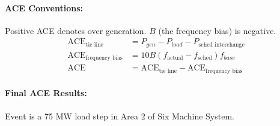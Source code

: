 \documentclass[12pt]{article}
\begin{document}
\begin{multicols}{2}
		

\vfill\null

\end{multicols}

\pagebreak
\paragraph{ACE Conventions:} Positive ACE denotes over generation. $B$ (the frequency bias) is negative.
\begin{align*}
\text{ACE}_{\text{tie line}} &= P_{gen} - P_{load} - P_{\text{sched interchange}}\\
\text{ACE}_{\text{frequency bias}} &= 10B(f_{\text{actual}}-f_{\text{sched}})f_{base}\\
\text{ACE} &= \text{ACE}_{\text{tie line}} -\text{ACE}_{\text{frequency bias}}
\end{align*}
\paragraph{Final ACE Results:} Event is a 75 MW load step in Area 2 of Six Machine System.\\
\end{document}

